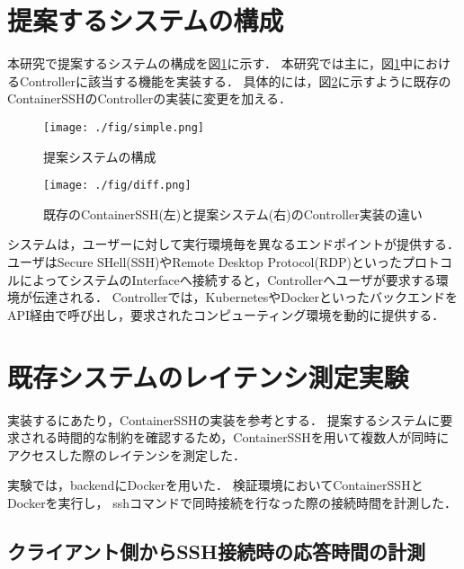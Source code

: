 \documentclass[dvipdfmx]{cs-handout}
\begin{document}
\section{提案するシステムの構成}

本研究で提案するシステムの構成を図\ref{fig:system}に示す．
本研究では主に，図\ref{fig:system}中におけるControllerに該当する機能を実装する．
具体的には，図\ref{fig:diff}に示すように既存のContainerSSHのControllerの実装に変更を加える．
%
\begin{figure}[htbp]
\texttt{[image: ./fig/simple.png]}
\caption{提案システムの構成}
\label{fig:system}
\end{figure}
%
\begin{figure}[tb]
\texttt{[image: ./fig/diff.png]}
\caption{既存のContainerSSH(左)と提案システム(右)のController実装の違い}
\label{fig:diff}
\end{figure}
%
システムは，ユーザーに対して実行環境毎を異なるエンドポイントが提供する．
ユーザはSecure SHell(SSH)やRemote Desktop Protocol(RDP)といったプロトコルによってシステムのInterfaceへ接続すると，Controllerへユーザが要求する環境が伝達される．
Controllerでは，KubernetesやDockerといったバックエンドをAPI経由で呼び出し，要求されたコンピューティング環境を動的に提供する．

\section{既存システムのレイテンシ測定実験}

実装するにあたり，ContainerSSHの実装を参考とする．
提案するシステムに要求される時間的な制約を確認するため，ContainerSSHを用いて複数人が同時にアクセスした際のレイテンシを測定した．

実験では，backendにDockerを用いた．
検証環境においてContainerSSHとDockerを実行し， sshコマンドで同時接続を行なった際の接続時間を計測した．

\subsection{クライアント側からSSH接続時の応答時間の計測}
\end{document}
